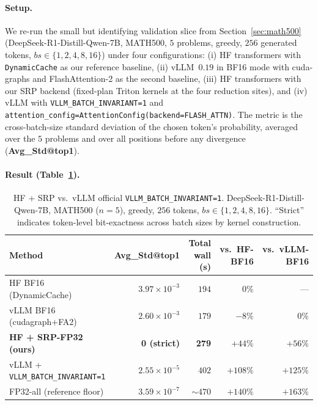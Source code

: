 \documentclass{article}
\begin{document}
\paragraph{Setup.}
We re-run the small but identifying validation slice from
Section~\ref{sec:math500} (DeepSeek-R1-Distill-Qwen-7B, MATH500, $5$ problems,
greedy, $256$ generated tokens, $\mathit{bs}\!\in\!\{1,2,4,8,16\}$) under four
configurations: (i) HF transformers with \texttt{DynamicCache} as our
reference baseline, (ii) vLLM~$0.19$ in BF16 mode with cuda-graphs and
FlashAttention-2 as the second baseline, (iii) HF transformers with our SRP
backend (fixed-plan Triton kernels at the four reduction sites), and (iv)
vLLM with \texttt{VLLM\_BATCH\_INVARIANT=1} and
\texttt{attention\_config=AttentionConfig(backend=FLASH\_ATTN)}. The metric
is the cross-batch-size standard deviation of the chosen token's probability,
averaged over the $5$ problems and over all positions before any divergence
(\textbf{Avg\_Std@top1}).

\paragraph{Result (Table~\ref{tab:srp_vs_vllm_bi}).}

\begin{table}[h]
\centering
\caption{HF + SRP vs.\ vLLM official \texttt{VLLM\_BATCH\_INVARIANT=1}.
DeepSeek-R1-Distill-Qwen-7B, MATH500 ($n\!=\!5$), greedy, $256$ tokens,
$\mathit{bs}\!\in\!\{1,2,4,8,16\}$. ``Strict'' indicates token-level
bit-exactness across batch sizes by kernel construction.}
\label{tab:srp_vs_vllm_bi}
\begin{tabular}{lrrrr}
\toprule
Method & Avg\_Std@top1 & Total wall (s) & vs.\ HF-BF16 & vs.\ vLLM-BF16 \\
\midrule
HF BF16 (DynamicCache)                               & $3.97\!\times\!10^{-3}$ & $194$ & $0\%$    & ---       \\
vLLM BF16 (cudagraph+FA2)                            & $2.60\!\times\!10^{-3}$ & $179$ & $-8\%$   & $0\%$     \\
\textbf{HF + SRP-FP32 (ours)}                        & \textbf{0 (strict)}     & \textbf{279} & $+44\%$  & $+56\%$   \\
vLLM + \texttt{VLLM\_BATCH\_INVARIANT=1}             & $2.55\!\times\!10^{-5}$ & $402$ & $+108\%$ & $+125\%$  \\
FP32-all (reference floor)                           & $3.59\!\times\!10^{-7}$ & $\sim\!470$ & $+140\%$ & $+163\%$ \\
\bottomrule
\end{tabular}
\end{table}
\end{document}
